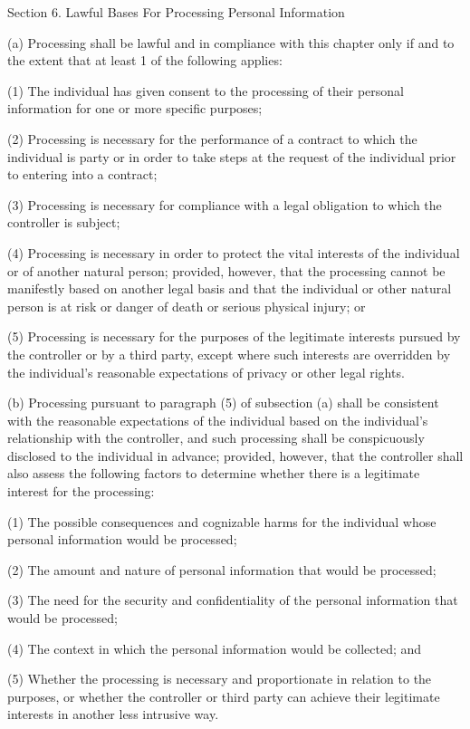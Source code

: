 Section 6. Lawful Bases For Processing Personal Information

(a) Processing shall be lawful and in compliance with this chapter only if and to the extent that at least 1 of the following applies:

(1) The individual has given consent to the processing of their personal information for one or more specific purposes;

(2) Processing is necessary for the performance of a contract to which the individual is party or in order to take steps at the request of the individual prior to entering into a contract;

(3) Processing is necessary for compliance with a legal obligation to which the controller is subject;

(4) Processing is necessary in order to protect the vital interests of the individual or of another natural person; provided, however, that the processing cannot be manifestly based on another legal basis and that the individual or other natural person is at risk or danger of death or serious physical injury; or

(5) Processing is necessary for the purposes of the legitimate interests pursued by the controller or by a third party, except where such interests are overridden by the individual’s reasonable expectations of privacy or other legal rights. 

(b) Processing pursuant to paragraph (5) of subsection (a) shall be consistent with the reasonable expectations of the individual based on the individual’s relationship with the controller, and such processing shall be conspicuously disclosed to the individual in advance; provided, however, that the controller shall also assess the following factors to determine whether there is a legitimate interest for the processing:

(1) The possible consequences and cognizable harms for the individual whose personal information would be processed;

(2) The amount and nature of personal information that would be processed;

(3) The need for the security and confidentiality of the personal information that would be processed;

(4) The context in which the personal information would be collected; and

(5) Whether the processing is necessary and proportionate in relation to the purposes, or whether the controller or third party can achieve their legitimate interests in another less intrusive way.

